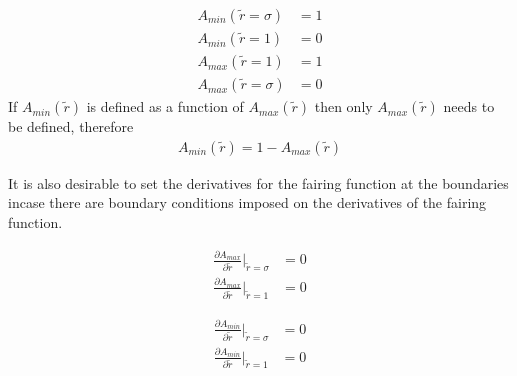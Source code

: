 \begin{align*}
    A_{min}(\widetilde{r} = \sigma) &= 1\\
    A_{min}(\widetilde{r} = 1) &= 0 \\
    A_{max}(\widetilde{r} = 1) &= 1 \\
    A_{max}(\widetilde{r} = \sigma) &= 0 
\end{align*}
If $A_{min}(\widetilde{r})$ is defined as a function of $A_{max}(\widetilde{r})$
then only $A_{max}(\widetilde{r})$ needs to be defined, therefore 
\begin{align*}
    A_{min}(\widetilde{r}) = 1 - A_{max}(\widetilde{r}) 
\end{align*}

It is also desirable to set the derivatives for the fairing function at the 
boundaries incase there are boundary conditions imposed on the derivatives of 
the fairing function.

\begin{align*}
    \frac{\partial A_{max}}{\partial \widetilde{r}}|_{\widetilde{r}= \sigma} &= 0\\
    \frac{\partial A_{max}}{\partial \widetilde{r}}|_{\widetilde{r}= 1} &= 0    
\end{align*}

\begin{align*}
    \frac{\partial A_{min}}{\partial \widetilde{r}}|_{\widetilde{r}= \sigma} &= 0\\
    \frac{\partial A_{min}}{\partial \widetilde{r}}|_{\widetilde{r}= 1} &= 0    
\end{align*}

